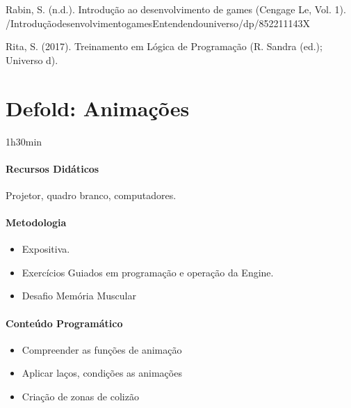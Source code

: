 \documentclass[letterpaper,10pt,brazil]{sphinxmanual}
\begin{document}
\sphinxAtStartPar
Rabin, S. (n.d.). Introdução ao desenvolvimento de games (Cengage Le, Vol. 1).
/Introdução\sphinxhyphen{}desenvolvimento\sphinxhyphen{}games\sphinxhyphen{}Entendendo\sphinxhyphen{}universo/dp/852211143X

\sphinxAtStartPar
Rita, S. (2017). Treinamento em Lógica de Programação (R. Sandra (ed.); Universo d).

\sphinxstepscope


\chapter{Defold: Animações}
\label{\detokenize{modelo_aula_06:defold-animacoes}}\label{\detokenize{modelo_aula_06::doc}}
\sphinxAtStartPar
{} 1h30min
\subsubsection*{Recursos Didáticos}

\sphinxAtStartPar
Projetor, quadro branco, computadores.
\subsubsection*{Metodologia}
\begin{itemize}
\item {} 
\sphinxAtStartPar
Expositiva.

\item {} 
\sphinxAtStartPar
Exercícios Guiados em programação e operação da Engine.

\item {} 
\sphinxAtStartPar
Desafio \sphinxhyphen{} Memória Muscular

\end{itemize}
\subsubsection*{Conteúdo Programático}
\begin{itemize}
\item {} 
\sphinxAtStartPar
Compreender as funções de animação

\item {} 
\sphinxAtStartPar
Aplicar laços, condições as animações

\item {} 
\sphinxAtStartPar
Criação de zonas de colizão

\end{itemize}
\end{document}
